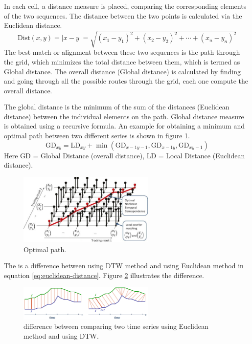 \documentclass[12pt, a4paper, twoside]{report}
\begin{document}
In each cell, a distance measure is placed, comparing the corresponding elements of the two sequences. The distance between the two points is calculated via the Euclidean distance.
\begin{equation}
\text{Dist}(x, y) = |x - y| = \sqrt{(x_1 - y_1)^2 + (x_2 - y_2)^2 + \cdots + (x_n - y_n)^2}
\label{eq:euclidean-distance}
\end{equation}
The best match or alignment between these two sequences is the path through the grid, which minimizes the total distance between them, which is termed as Global distance. The overall distance (Global distance) is calculated by finding and going through all the possible routes through the grid, each one compute the overall distance.
\par
The global distance is the minimum of the sum of the distances (Euclidean distance) between the individual elements on the path. Global distance measure is obtained using a recursive formula. An example for obtaining a minimum and optimal path between two different series is shown in figure \ref{fig:dtw-optimal}.
\begin{equation*}
\text{GD}_{xy} = \text{LD}_{xy} + \min(\text{GD}_{x-1y-1}, \text{GD}_{x-1y}, \text{GD}_{xy-1})
\end{equation*}        
Here GD = Global Distance (overall distance), LD = Local Distance (Euclidean distance).
\begin{figure}[H]
	\centering
	\includegraphics[width=0.6\textwidth]
	{images/chapter4/dtw-optimal}
	\caption{Optimal path.}
	\label{fig:dtw-optimal}
\end{figure}

The is a difference between using DTW method and using Euclidean method in equation \ref{eq:euclidean-distance}. Figure \ref{fig:dtw-diff} illustrates the difference.
\begin{figure}[H]
	\centering
	\includegraphics[width=0.6\textwidth]
	{images/chapter4/dtw-diff}
	\caption{difference between comparing two time series using Euclidean method and using DTW.}
	\label{fig:dtw-diff}
\end{figure}
\end{document}
